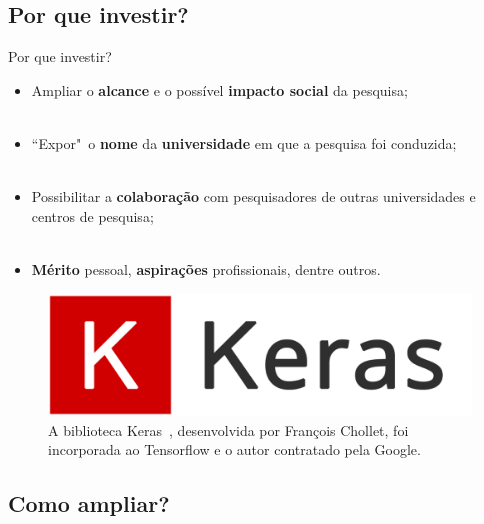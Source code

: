 \subsection{Por que investir?}
\label{ss.why_visibility}

\begin{frame}{Por que investir?}
	\justify 
	\begin{itemize}
		\item<1> Ampliar o \textbf{alcance} e o possível \textbf{impacto social} da pesquisa;
		\\~\\
		\item<2> ``Expor"~o \textbf{nome} da \textbf{universidade} em que a pesquisa foi conduzida;
		\\~\\
		\item<3> Possibilitar a \textbf{colaboração} com pesquisadores de outras universidades e centros de pesquisa;
		\\~\\
		\item<4> \textbf{Mérito} pessoal, \textbf{aspirações} profissionais, dentre outros.
	\end{itemize}
\end{frame}

\begin{frame}{}
	\centering
	\begin{figure}
		\includegraphics[scale=0.2]{figs/keras.png}
		\caption{A biblioteca Keras~\cite{Chollet:15}, desenvolvida por François Chollet, foi incorporada ao Tensorflow e o autor contratado pela Google.}
		\label{f.keras}
	\end{figure}
\end{frame}


\subsection{Como ampliar?}
\label{ss.how_visibility}

